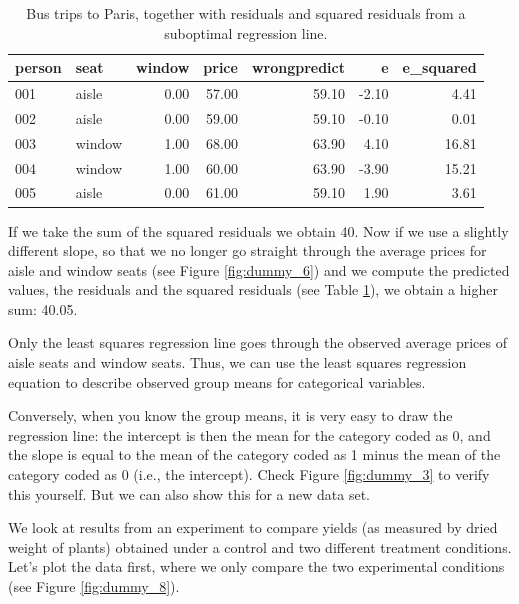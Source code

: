 \documentclass[]{book}\usepackage[]{graphicx}\usepackage[]{color}
\begin{document}
\begin{table}[ht]
\centering
\caption{Bus trips to Paris, together with residuals and squared residuals from  a suboptimal regression line.} 
\label{tab:dummy_7}
\begin{tabular}{llrrrrr}
  \hline
person & seat & window & price & wrongpredict & e & e\_squared \\ 
  \hline
001 & aisle & 0.00 & 57.00 & 59.10 & -2.10 & 4.41 \\ 
  002 & aisle & 0.00 & 59.00 & 59.10 & -0.10 & 0.01 \\ 
  003 & window & 1.00 & 68.00 & 63.90 & 4.10 & 16.81 \\ 
  004 & window & 1.00 & 60.00 & 63.90 & -3.90 & 15.21 \\ 
  005 & aisle & 0.00 & 61.00 & 59.10 & 1.90 & 3.61 \\ 
   \hline
\end{tabular}
\end{table}


If we take the sum of the squared residuals we obtain 40. Now if we use a slightly different slope, so that we no longer go straight through the average prices for aisle and window seats (see Figure \ref{fig:dummy_6}) and we compute the predicted values, the residuals and the squared residuals (see Table \ref{tab:dummy_7}), we obtain a higher sum: 40.05. 

Only the least squares regression line goes through the observed average prices of aisle seats and window seats. Thus, we can use the least squares regression equation to describe observed group means for categorical variables. 

Conversely, when you know the group means, it is very easy to draw the regression line: the intercept is then the mean for the category coded as 0, and the slope is equal to the mean of the category coded as 1 minus the mean of the category coded as 0 (i.e., the intercept). Check Figure \ref{fig:dummy_3} to verify this yourself. But we can also show this for a new data set.


We look at results from an experiment to compare yields (as measured by dried weight of plants) obtained under a control and two different treatment conditions. Let's plot the data first, where we only compare the two experimental conditions (see Figure \ref{fig:dummy_8}).
\end{document}
